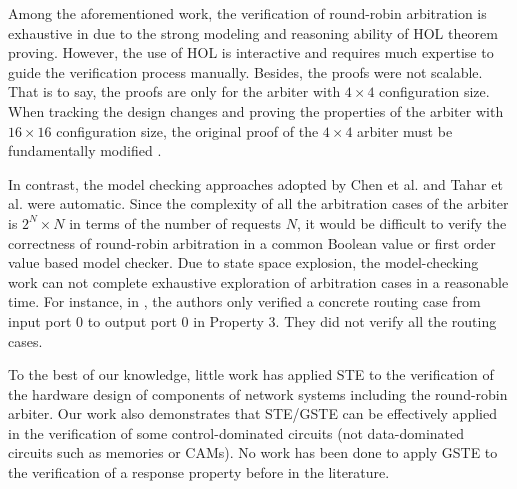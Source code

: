\documentclass[final]{IEEEtran}
\begin{document}
Among the aforementioned work, the verification of round-robin
arbitration is exhaustive in \cite{Paul94, PaulTech94} due to the
strong modeling and reasoning ability of HOL theorem proving.
However, the use of HOL is interactive and requires much expertise
to guide the verification process manually. Besides, the proofs were
not scalable. That is to say, the proofs are only for the arbiter
with $4 \times 4$ configuration size. When tracking the design
changes and proving the properties of the arbiter with $16 \times
16$ configuration size, the original proof of the $4 \times 4$
arbiter must be fundamentally modified \cite{CurzonATM}.%

 In contrast, the model checking approaches adopted by Chen et al. and Tahar et al. were
automatic. Since the complexity of all the arbitration cases of the
arbiter is $2^{N}\times N$ in terms of the number of requests
$N$, it would be difficult to verify the correctness of round-robin
arbitration in a common Boolean value or first order value based
model checker. Due to state space explosion, the model-checking
work can not complete exhaustive exploration of arbitration cases
in a reasonable time.
For instance, in \cite{DBLP:journals/tcad/TaharSCZLM99}, the authors
only verified a concrete routing case from input port 0 to output
port 0 in Property 3. They did not verify all the routing cases.

To the best of our knowledge, little work has applied STE to the
verification of the hardware design of components of network systems
including the round-robin arbiter. Our work also demonstrates that
STE/GSTE can be effectively applied in the verification of some
control-dominated circuits (not data-dominated circuits such as
memories or CAMs). No work has been done to apply GSTE to the
verification of a response property before in the literature.

\end{document}
